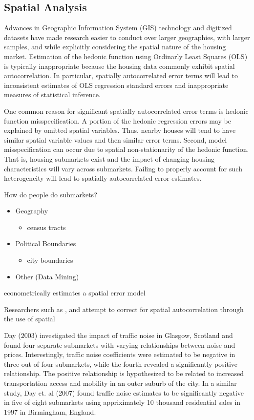 \documentclass{article}\usepackage{graphicx, color}
\begin{document}
\subsection{Spatial Analysis}
Advances in Geographic Information System (GIS) technology and digitized datasets have made research easier to conduct over larger geographies, with larger samples, and while explicitly considering the spatial nature of the housing market. Estimation of the hedonic function using Ordinarly Least Squares (OLS) is typically inappropriate because the housing data commonly exhibit spatial autocorrelation. In particular, spatially autocorrelated error terms will lead to inconsistent estimates of OLS regression standard errors and inappropriate measures of statistical inference. 

One common reason for significant spatially autocorrelated error terms is hedonic function misspecification. A portion of the hedonic regression errors may be explained by omitted spatial variables. Thus, nearby houses will tend to have similar spatial variable values and then similar error terms. Second, model misspecification can occur due to spatial non-stationarity of the hedonic function. That is, housing submarkets exist and the impact of changing housing characteristics will vary across submarkets. Failing to properly account for such heterogeneity will lead to spatially autocorrelated error estimates.

How do people do submarkets? 
\begin{itemize}
  \item Geography 
    \begin{itemize}
      \item census tracts
    \end{itemize}
  \item Political Boundaries
    \begin{itemize}
      \item city boundaries
    \end{itemize}
  \item Other (Data Mining)
\end{itemize}

\citet{Theebe2004a} econometrically estimates a spatial error model

Researchers such as , and \citet{Andersson2010} attempt to correct for spatial autocorrelation through the use of spatial


Day (2003) investigated the impact of traffic noise in Glasgow, Scotland and found four separate submarkets with varying relationships between noise and prices. Interestingly, traffic noise coefficients were estimated to be negative in three out of four submarkets, while the fourth revealed a significantly positive relationship. The positive relationship is hypothesized to be related to increased transportation access and mobility in an outer suburb of the city. In a similar study, Day et. al (2007) found traffic noise estimates to be significantly negative in five of eight submarkets using appriximately 10 thousand residential sales in 1997 in Birmingham, England.  
\end{document}

